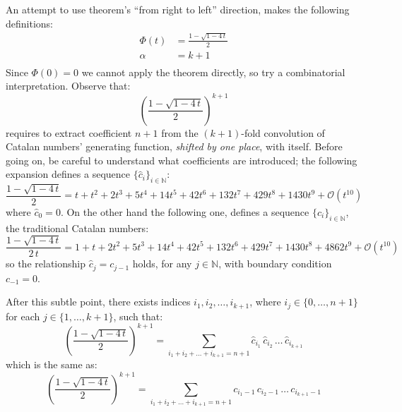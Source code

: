 \documentclass[11pt,a4paper]{article} %
\begin{document}
    An attempt to use theorem's ``from right to left'' direction, makes 
    the following definitions:
    \begin{displaymath}
        \begin{split}
            \Phi(t)&=\frac{1-\sqrt{1-4\,t}}{2}\\
            \alpha&=k+1\\
        \end{split}
    \end{displaymath}
    Since $\Phi(0)=0$ we cannot apply the theorem directly, so try
    a combinatorial interpretation. Observe that:
    \begin{displaymath}
        [t^{n+1}] \left(\frac{1-\sqrt{1-4\,t}}{2}\right)^{k+1} 
    \end{displaymath}
    requires to extract coefficient $n+1$ from the $(k+1)$-fold
    convolution of Catalan numbers' generating function, \emph{shifted
    by one place}, with itself. Before going on, be careful
    to understand what coefficients are introduced; the
    following expansion defines a sequence $\lbrace \hat{c}_{i}\rbrace_{i\in\mathbb{N}}$:
    \begin{displaymath}
        \frac{1-\sqrt{1-4\,t}}{2} = t + t^{2} + 2 t^{3} + 5 t^{4} 
            + 14 t^{5} + 42 t^{6} + 132 t^{7} + 429 t^{8} + 1430 t^{9} 
            + \mathcal{O}\left(t^{10}\right)
    \end{displaymath}
    where $\hat{c}_{0}=0$. On the other hand the following one, defines a sequence 
    $\lbrace c_{i}\rbrace_{i\in\mathbb{N}}$, the traditional Catalan numbers:
    \begin{displaymath}
        \frac{1-\sqrt{1-4\,t}}{2\,t} = 1 + t + 2 t^{2} + 5 t^{3} + 14 t^{4} 
            + 42 t^{5} + 132 t^{6} + 429 t^{7} + 1430 t^{8} + 4862 t^{9} 
            + \mathcal{O}\left(t^{10}\right)
    \end{displaymath}
    so the relationship $\hat{c}_{j} = c_{j-1}$ holds, for any $j\in\mathbb{N}$, 
    with boundary condition $c_{-1}=0$. 

    After this subtle point, there exists indices $i_{1}, i_{2}, \ldots, i_{k+1}$,
    where $i_{j}\in\lbrace0,\ldots,n+1\rbrace$ for each $j\in\lbrace1,\ldots,k+1\rbrace$, 
    such that:
    \begin{displaymath}
        [t^{n+1}] \left(\frac{1-\sqrt{1-4\,t}}{2}\right)^{k+1} 
            = \sum_{i_{1}+ i_{2}+ \ldots+ i_{k+1}=n+1}{
                \hat{c}_{i_{1}}\,\hat{c}_{i_{2}}\,\ldots\,\hat{c}_{i_{k+1}} }
    \end{displaymath}
    which is the same as:
    \begin{displaymath}
        [t^{n+1}] \left(\frac{1-\sqrt{1-4\,t}}{2}\right)^{k+1} 
            = \sum_{i_{1}+ i_{2}+ \ldots+ i_{k+1}=n+1}{
                c_{i_{1}-1}\,c_{i_{2}-1}\,\ldots\,c_{i_{k+1}-1} }
    \end{displaymath}
\end{document}
